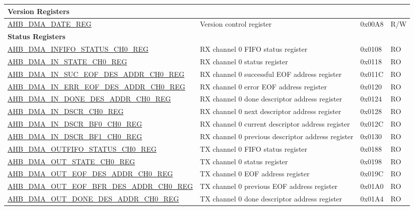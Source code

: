 \begin{longtable}{ | l | p{10cm} | p{1.3cm} | l | }
\multicolumn{4}{|l|}{\textbf{Version Registers}} \\ \hline
\hyperref[regdesc:AHBDMADATEREG]{AHB\_DMA\_DATE\_REG} & Version control register & 0x00A8 & R/W \\ \hline
\multicolumn{4}{|l|}{\textbf{Status Registers}} \\ \hline
\hyperref[regdesc:AHBDMAINFIFOSTATUSCHNREG]{AHB\_DMA\_INFIFO\_STATUS\_CH0\_REG} & RX channel 0 FIFO status register & 0x0108 & RO \\ \hline
\hyperref[regdesc:AHBDMAINSTATECHNREG]{AHB\_DMA\_IN\_STATE\_CH0\_REG} & RX channel 0 status register & 0x0118 & RO \\ \hline
\hyperref[regdesc:AHBDMAINSUCEOFDESADDRCHNREG]{AHB\_DMA\_IN\_SUC\_EOF\_DES\_ADDR\_CH0\_REG} & RX channel 0 successful EOF address register & 0x011C & RO \\ \hline
\hyperref[regdesc:AHBDMAINERREOFDESADDRCHNREG]{AHB\_DMA\_IN\_ERR\_EOF\_DES\_ADDR\_CH0\_REG} & RX channel 0 error EOF address register & 0x0120 & RO \\ \hline
\hyperref[regdesc:AHBDMAINDONEDESADDRCHNREG]{AHB\_DMA\_IN\_DONE\_DES\_ADDR\_CH0\_REG} & RX channel 0 done descriptor address register & 0x0124 & RO \\ \hline
\hyperref[regdesc:AHBDMAINDSCRCHNREG]{AHB\_DMA\_IN\_DSCR\_CH0\_REG} & RX channel 0 next descriptor address register & 0x0128 & RO \\ \hline
\hyperref[regdesc:AHBDMAINDSCRBF0CHNREG]{AHB\_DMA\_IN\_DSCR\_BF0\_CH0\_REG} & RX channel 0 current descriptor address register & 0x012C & RO \\ \hline
\hyperref[regdesc:AHBDMAINDSCRBF1CHNREG]{AHB\_DMA\_IN\_DSCR\_BF1\_CH0\_REG} & RX channel 0 previous descriptor address register & 0x0130 & RO \\ \hline
\hyperref[regdesc:AHBDMAOUTFIFOSTATUSCHNREG]{AHB\_DMA\_OUTFIFO\_STATUS\_CH0\_REG} & TX channel 0 FIFO status register & 0x0188 & RO \\ \hline
\hyperref[regdesc:AHBDMAOUTSTATECHNREG]{AHB\_DMA\_OUT\_STATE\_CH0\_REG} & TX channel 0 status register & 0x0198 & RO \\ \hline
\hyperref[regdesc:AHBDMAOUTEOFDESADDRCHNREG]{AHB\_DMA\_OUT\_EOF\_DES\_ADDR\_CH0\_REG} & TX channel 0 EOF address register & 0x019C & RO \\ \hline
\hyperref[regdesc:AHBDMAOUTEOFBFRDESADDRCHNREG]{AHB\_DMA\_OUT\_EOF\_BFR\_DES\_ADDR\_CH0\_REG} & TX channel 0 previous EOF address register & 0x01A0 & RO \\ \hline
\hyperref[regdesc:AHBDMAOUTDONEDESADDRCHNREG]{AHB\_DMA\_OUT\_DONE\_DES\_ADDR\_CH0\_REG} & TX channel 0 done descriptor address register & 0x01A4 & RO \\ \hline

\end{longtable}
